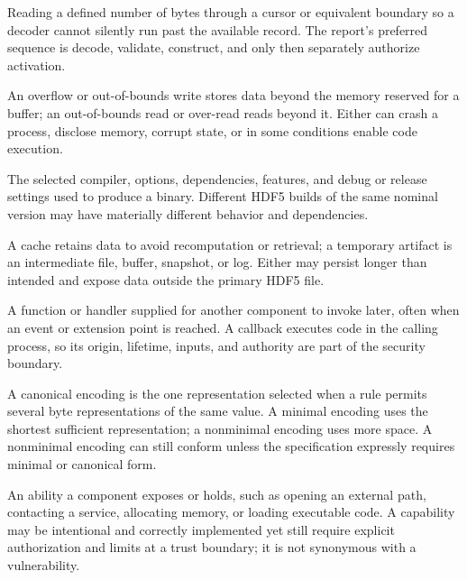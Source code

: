 \documentclass[../main.tex]{subfiles}
\begin{document}
\begin{description}[leftmargin=1.5em,style=nextline]
\item[Bounded decode.]
Reading a defined number of bytes through a cursor or equivalent boundary so a
decoder cannot silently run past the available record. The report's preferred
sequence is decode, validate, construct, and only then separately authorize
activation.

\item[Buffer overflow / out-of-bounds read or write / buffer over-read.]
An overflow or out-of-bounds write stores data beyond the memory reserved for a
buffer; an out-of-bounds read or over-read reads beyond it. Either can crash a
process, disclose memory, corrupt state, or in some conditions enable code
execution.

\item[Build configuration / build profile.]
The selected compiler, options, dependencies, features, and debug or release
settings used to produce a binary. Different HDF5 builds of the same nominal
version may have materially different behavior and dependencies.

\item[Cache / temporary artifact.]
A cache retains data to avoid recomputation or retrieval; a temporary artifact
is an intermediate file, buffer, snapshot, or log. Either may persist longer
than intended and expose data outside the primary HDF5 file.

\item[Callback.]
A function or handler supplied for another component to invoke later, often
when an event or extension point is reached. A callback executes code in the
calling process, so its origin, lifetime, inputs, and authority are part of the
security boundary.

\item[Canonical / minimal / nonminimal encoding.]
A canonical encoding is the one representation selected when a rule permits
several byte representations of the same value. A minimal encoding uses the
shortest sufficient representation; a nonminimal encoding uses more space. A
nonminimal encoding can still conform unless the specification expressly
requires minimal or canonical form.

\item[Capability.]
An ability a component exposes or holds, such as opening an external path,
contacting a service, allocating memory, or loading executable code. A
capability may be intentional and correctly implemented yet still require
explicit authorization and limits at a trust boundary; it is not synonymous
with a vulnerability.


\end{description}
\end{document}
